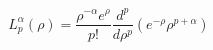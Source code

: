 \documentclass[border=2pt,varwidth]{standalone}
\begin{document}
\[
  L_{p}^{\alpha} \left ( \rho \right ) =
  \frac{\rho^{-\alpha} e^{\rho}}{p!}
  \frac{d^p}{d \rho^p}
  \left (
   e^{-\rho} \rho^{p+\alpha}
  \right )
\]
\end{document}
